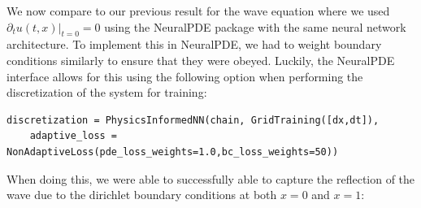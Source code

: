 \documentclass[11pt]{article}
\newcommand{\1}{\mathbf 1}
\begin{document}
We now compare to our previous result for the wave equation where we used $\left.\partial_t u(t,x) \right|_{t = 0} = 0$ using the NeuralPDE package with the same neural network architecture.
To implement this in NeuralPDE, we had to weight boundary conditions similarly to ensure that they were obeyed.
Luckily, the NeuralPDE interface allows for this using the following option when performing the discretization of the system for training:
\begin{singlespace}	
\begin{verbatim}
discretization = PhysicsInformedNN(chain, GridTraining([dx,dt]),
	adaptive_loss = NonAdaptiveLoss(pde_loss_weights=1.0,bc_loss_weights=50))
\end{verbatim}
\end{singlespace}
When doing this, we were able to successfully able to capture the reflection of the wave due to the dirichlet boundary conditions at both $x = 0$ and $x = 1$:
\end{document}
